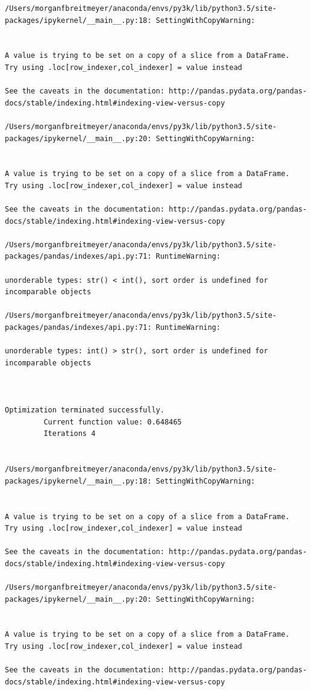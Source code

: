 \begin{lstlisting}
/Users/morganfbreitmeyer/anaconda/envs/py3k/lib/python3.5/site-packages/ipykernel/__main__.py:18: SettingWithCopyWarning:


A value is trying to be set on a copy of a slice from a DataFrame.
Try using .loc[row_indexer,col_indexer] = value instead

See the caveats in the documentation: http://pandas.pydata.org/pandas-docs/stable/indexing.html#indexing-view-versus-copy

/Users/morganfbreitmeyer/anaconda/envs/py3k/lib/python3.5/site-packages/ipykernel/__main__.py:20: SettingWithCopyWarning:


A value is trying to be set on a copy of a slice from a DataFrame.
Try using .loc[row_indexer,col_indexer] = value instead

See the caveats in the documentation: http://pandas.pydata.org/pandas-docs/stable/indexing.html#indexing-view-versus-copy

/Users/morganfbreitmeyer/anaconda/envs/py3k/lib/python3.5/site-packages/pandas/indexes/api.py:71: RuntimeWarning:

unorderable types: str() < int(), sort order is undefined for incomparable objects

/Users/morganfbreitmeyer/anaconda/envs/py3k/lib/python3.5/site-packages/pandas/indexes/api.py:71: RuntimeWarning:

unorderable types: int() > str(), sort order is undefined for incomparable objects



Optimization terminated successfully.
         Current function value: 0.648465
         Iterations 4


/Users/morganfbreitmeyer/anaconda/envs/py3k/lib/python3.5/site-packages/ipykernel/__main__.py:18: SettingWithCopyWarning:


A value is trying to be set on a copy of a slice from a DataFrame.
Try using .loc[row_indexer,col_indexer] = value instead

See the caveats in the documentation: http://pandas.pydata.org/pandas-docs/stable/indexing.html#indexing-view-versus-copy

/Users/morganfbreitmeyer/anaconda/envs/py3k/lib/python3.5/site-packages/ipykernel/__main__.py:20: SettingWithCopyWarning:


A value is trying to be set on a copy of a slice from a DataFrame.
Try using .loc[row_indexer,col_indexer] = value instead

See the caveats in the documentation: http://pandas.pydata.org/pandas-docs/stable/indexing.html#indexing-view-versus-copy


\end{lstlisting}
